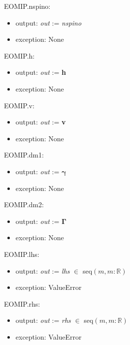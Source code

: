 \documentclass[12pt, titlepage]{article}
\begin{document}
\noindent EOMIP.nspino:
\begin{itemize}
	\item output: \textit{out} := \textit{nspino}
	\item exception: None
\end{itemize}

\noindent EOMIP.h:
\begin{itemize}
	\item output: \textit{out} := \textbf{h}
	\item exception: None
\end{itemize}

\noindent EOMIP.v:
\begin{itemize}
	\item output: \textit{out} := \textbf{v}
	\item exception: None
\end{itemize}

\noindent EOMIP.dm1:
\begin{itemize}
	\item output: \textit{out} := $\boldsymbol{\gamma}$
	\item exception: None
\end{itemize}

\noindent EOMIP.dm2:
\begin{itemize}
	\item output: \textit{out} := $\boldsymbol{\Gamma}$
	\item exception: None
\end{itemize}

\noindent EOMIP.lhs:
\begin{itemize}
	\item output: \textit{out} := \textit{lhs} $\in$ seq$(m,m:\mathbb{R})$
	\item exception: ValueError
\end{itemize}

\noindent EOMIP.rhs:
\begin{itemize}
	\item output: \textit{out} := \textit{rhs} $\in$ seq$(m,m:\mathbb{R})$
	\item exception: ValueError
\end{itemize}
\end{document}
